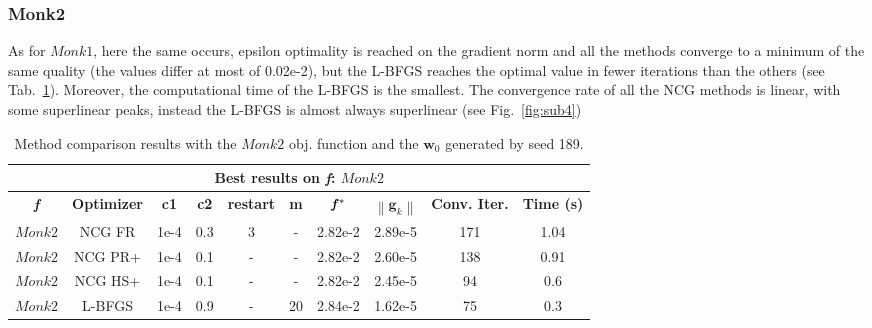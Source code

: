 \documentclass[11pt]{article}
\newcommand{\norm}[1]{\left\lVert#1\right\rVert}
\begin{document}
\subsubsection{Monk2}
As for $Monk1$, here the same occurs, epsilon optimality is reached on the gradient norm and all the methods converge to a minimum of the same quality (the values differ at most of 0.02e-2), but the L-BFGS reaches the optimal value in fewer iterations than the others (see Tab.~\ref{tab:monk2_method_comparisons}). Moreover, the computational time of the L-BFGS is the smallest. The convergence rate of all the NCG methods is linear, with some superlinear peaks, instead the L-BFGS is almost always superlinear (see Fig.~\ref{fig:sub4})

\begin{table}[H]
\small
    \centering
    \begin{tabular}{ |c|c|c|c|c|c|c|c|c|c|}
    \hline
     \multicolumn{10}{|c|}{\textbf{Best results on \textit{f}: $Monk2$}} \\
      \hline
       \textbf{\textit{f}} & \textbf{Optimizer} & \textbf{c1} &  \textbf{c2} & \textbf{restart} & \textbf{m} & $\mathbf{\textit{\textbf{f}}\,^*}$ & $\norm{\mathbf{g}_k}$ & \textbf{Conv. Iter.} & \textbf{Time (s)}\\
     \hline
      $Monk2$ & NCG FR & 1e-4 & 0.3  & 3  & -  & 2.82e-2  & 2.89e-5 & 171  & 1.04 \\
      \hline
      $Monk2$ & NCG PR+ & 1e-4 & 0.1  & -  & -  & 2.82e-2  & 2.60e-5 & 138  & 0.91 \\
      \hline
      $Monk2$ & NCG HS+ & 1e-4 & 0.1  & -  & -  & 2.82e-2  & 2.45e-5 & 94  & 0.6 \\
      \hline
      $Monk2$ & L-BFGS & 1e-4 & 0.9  & -  & 20  & 2.84e-2  & 1.62e-5 & 75  & 0.3\\
      \hline
    \end{tabular}
    \caption{Method comparison results with the $Monk2$ obj. function and the $\mathbf{w}_0$ generated by seed 189.}
    \label{tab:monk2_method_comparisons}
\end{table}
\end{document}
